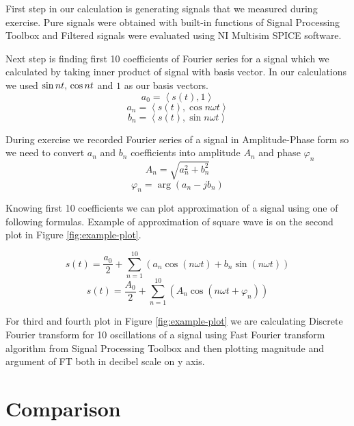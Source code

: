 \documentclass[notitlepage, a4paper, 11pt]{article}
\begin{document}
	First step in our calculation is generating signals that we measured during exercise. Pure signals were obtained with built-in functions of Signal Processing Toolbox and Filtered signals were evaluated using NI Multisim SPICE software.
		
	Next step is finding first 10 coefficients of Fourier series for a signal which we calculated by taking inner product of signal with basis vector. In our calculations we used $\sin nt ,\thinspace \cos nt$ and $1$ as our basis vectors.
	\begin{equation}
		a_0 = \left\langle s(t), 1 \right\rangle
	\end{equation}
	\begin{equation}
		a_n = \left\langle s(t), \cos n\omega t \right\rangle
	\end{equation}
	\begin{equation}
		b_n = \left\langle s(t), \sin n\omega t \right\rangle
	\end{equation}

	During exercise we recorded Fourier series of a signal in Amplitude-Phase form so we need to convert $a_n$ and $b_n$ coefficients into amplitude $A_n$ and phase $\varphi_n$
	\begin{equation}
		A_n = \sqrt{a_n^2 + b_n^2}
	\end{equation}
	\begin{equation}
		\varphi_n = \arg(a_n - j b_n)
	\end{equation}
		
	Knowing first 10 coefficients we can plot approximation of a signal using one of following formulas. Example of approximation of square wave is on the second plot in Figure \ref{fig:example-plot}.
	
	\begin{equation}
		s(t) = \frac{a_0}{2} + \sum_{n=1}^{10}(a_n\cos(n\omega t)+b_n\sin(n\omega t))
	\end{equation}
	\begin{equation}
		s(t) = \frac{A_0}{2} + \sum_{n=1}^{10}(A_n\cos(n\omega t +\varphi_n))
	\end{equation}

	For third and fourth plot in Figure \ref{fig:example-plot} we are calculating Discrete Fourier transform for 10 oscillations of a signal using Fast Fourier transform algorithm from Signal Processing Toolbox and then plotting magnitude and argument of FT both in decibel scale on y axis.

	\section{Comparison}
\end{document}
